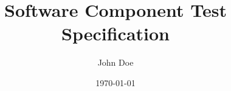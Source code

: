 \documentclass{report}
\begin{document}
\thispagestyle{empty}

\title{Software Component Test Specification}
\author{John Doe}
\date{\today}
\maketitle
\newpage

\tableofcontents
\newpage



\appendix

\end{document}
